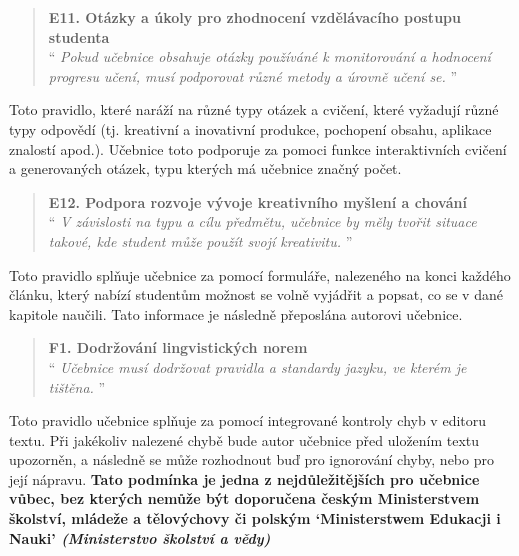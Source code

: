 \documentclass[12pt]{article}
\begin{document}
\begin{samepage}
	\begin{quotation}
		\textbf{E11. Otázky a úkoly pro zhodnocení vzdělávacího postupu studenta} \\
		\enquote{\textit{
				Pokud učebnice obsahuje otázky používáné k monitorování a hodnocení progresu učení, musí podporovat různé metody a úrovně učení se.
		}}
	\end{quotation}

	Toto pravidlo, které naráží na různé typy otázek a cvičení, které vyžadují různé typy odpovědí (tj. kreativní a inovativní produkce, pochopení obsahu, aplikace znalostí apod.). Učebnice toto podporuje za pomoci funkce interaktivních cvičení a generovaných otázek, typu kterých má učebnice značný počet.
\end{samepage}

\filbreak

\begin{samepage}
	\begin{quotation}
		\textbf{E12. Podpora rozvoje vývoje kreativního myšlení a chování} \\
		\enquote{\textit{
				V závislosti na typu a cílu předmětu, učebnice by měly tvořit situace takové, kde student může použít svojí kreativitu.
	}}		\end{quotation}

	Toto pravidlo splňuje učebnice za pomocí formuláře, nalezeného na konci každého článku, který nabízí studentům možnost se volně vyjádřit a popsat, co se v dané kapitole naučili. Tato informace je následně přeposlána autorovi učebnice.
\end{samepage}

\filbreak

\begin{samepage}
	\begin{quotation}
		\textbf{F1. Dodržování lingvistických norem} \\
		\enquote{\textit{
				Učebnice musí dodržovat pravidla a standardy jazyku, ve kterém je tištěna.
		}}
	\end{quotation}

	Toto pravidlo učebnice splňuje za pomocí integrované kontroly chyb v editoru textu. Při jakékoliv nalezené chybě bude autor učebnice před uložením textu upozorněn, a následně se může rozhodnout buď pro ignorování chyby, nebo pro její nápravu. \textbf{Tato podmínka je jedna z nejdůležitějších pro učebnice vůbec, bez kterých nemůže být doporučena českým Ministerstvem školství, mládeže a tělovýchovy či polským \enquote*{Ministerstwem Edukacji i Nauki} \textit{(Ministerstvo školství a vědy)}} \cite[s. 81-87]{PAN2023}
\end{samepage}
\end{document}
